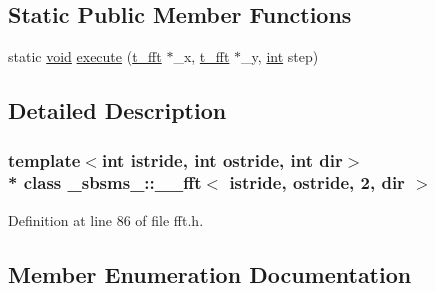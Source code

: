 \subsection*{Static Public Member Functions}
\begin{DoxyCompactItemize}
\item 
static \hyperlink{sound_8c_ae35f5844602719cf66324f4de2a658b3}{void} \hyperlink{class__sbsms___1_1____fft_3_01istride_00_01ostride_00_012_00_01dir_01_4_acbcd4de1546c56b99350bcea7fa5e61d}{execute} (\hyperlink{namespace__sbsms___af5c6f976b2da21c36853e3b0c5995a54}{t\+\_\+fft} $\ast$\+\_\+x, \hyperlink{namespace__sbsms___af5c6f976b2da21c36853e3b0c5995a54}{t\+\_\+fft} $\ast$\+\_\+y, \hyperlink{xmltok_8h_a5a0d4a5641ce434f1d23533f2b2e6653}{int} step)
\end{DoxyCompactItemize}


\subsection{Detailed Description}
\subsubsection*{template$<$int istride, int ostride, int dir$>$\\*
class \+\_\+sbsms\+\_\+\+::\+\_\+\+\_\+fft$<$ istride, ostride, 2, dir $>$}



Definition at line 86 of file fft.\+h.



\subsection{Member Enumeration Documentation}
